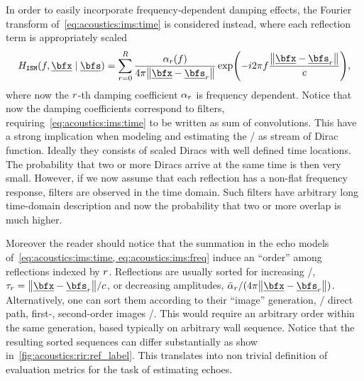 \mynewline
In order to easily incorporate frequency-dependent damping effects, the Fourier transform of~\cref{eq:acoustics:ims:time} is considered instead, where
each reflection term is appropriately scaled
\begin{equation}\label{eq:acoustics:ims:freq}
    \rirFreq_{\mathtt{ISM}}(f, \positionMicrophone \mid \positionSource) =
        \sum_{\idxEch=0}^{\numEchs} \frac{\absCoeff_{\idxEch}(f)}{4 \pi \norm{\positionMicrophone - \positionSource_\idxEch}}
        \exp\kparen{- \csti 2 \pi f \frac{\norm{\positionMicrophone - \positionSource_\idxEch}}{\speedOfSound}}
        ,
\end{equation}
where now the $r$-th damping coefficient $\alpha_{r}$ is frequency dependent.
Notice that now the damping coefficients correspond to filters, requiring~\cref{eq:acoustics:ims:time} to be written as sum of convolutions.
This have a strong implication when modeling and estimating the \RIRs/ as stream of Dirac function.
Ideally they consists of scaled Diracs with well defined time locations.
The probability that two or more Diracs arrive at the same time is then very small.
However, if we now assume that each reflection has a non-flat frequency response, filters are observed in the time domain.
Such filters have arbitrary long time-domain description and now the probability that two or more overlap is much higher.



\mynewline
Moreover the reader should notice that the summation in the echo models of~\cref{eq:acoustics:ims:time, eq:acoustics:ims:freq} induce an ``order'' among reflections indexed by $r$.
Reflections are usually sorted for increasing \TOA/, $\tau_r = \norm{\positionMicrophone - \positionSource_\idxEch}/\speedOfSound$,
or decreasing amplitudes, $\bar{\absCoeff}_{\idxEch}/(4 \pi \norm{\positionMicrophone - \positionSource_\idxEch})$.
Alternatively, one can sort them according to their ``image'' generation, \eg/ direct path, first-, second-order images \etc/.
This would require an arbitrary order within the same generation, based typically on arbitrary wall sequence.
Notice that the resulting sorted sequences can differ substantially as show in~\cref{fig:acoustics:rir:ref_label}.
This translates into non trivial definition of evaluation metrics for the task of estimating echoes.

